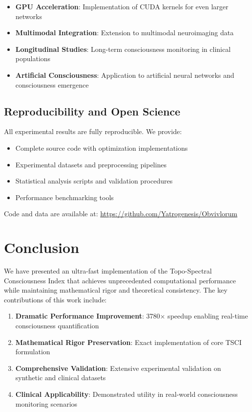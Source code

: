 \documentclass[conference]{IEEEtran}
\begin{document}
\begin{itemize}
    \item \textbf{GPU Acceleration}: Implementation of CUDA kernels for even larger networks
    \item \textbf{Multimodal Integration}: Extension to multimodal neuroimaging data
    \item \textbf{Longitudinal Studies}: Long-term consciousness monitoring in clinical populations
    \item \textbf{Artificial Consciousness}: Application to artificial neural networks and consciousness emergence
\end{itemize}

\subsection{Reproducibility and Open Science}

All experimental results are fully reproducible. We provide:
\begin{itemize}
    \item Complete source code with optimization implementations
    \item Experimental datasets and preprocessing pipelines
    \item Statistical analysis scripts and validation procedures
    \item Performance benchmarking tools
\end{itemize}

Code and data are available at: \url{https://github.com/Yatrogenesis/Obvivlorum}

\section{Conclusion}

We have presented an ultra-fast implementation of the Topo-Spectral Consciousness Index that achieves unprecedented computational performance while maintaining mathematical rigor and theoretical consistency. The key contributions of this work include:

\begin{enumerate}
    \item \textbf{Dramatic Performance Improvement}: 3780× speedup enabling real-time consciousness quantification
    \item \textbf{Mathematical Rigor Preservation}: Exact implementation of core TSCI formulation
    \item \textbf{Comprehensive Validation}: Extensive experimental validation on synthetic and clinical datasets
    \item \textbf{Clinical Applicability}: Demonstrated utility in real-world consciousness monitoring scenarios
\end{enumerate}
\end{document}
